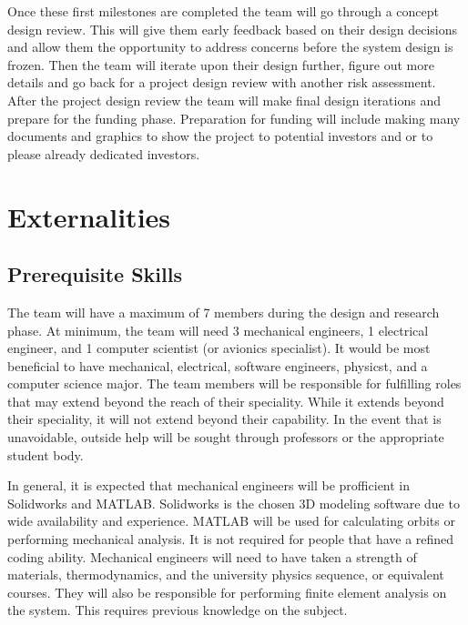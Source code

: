 \documentclass[conference]{IEEEtran} %
\begin{document}
Once these first milestones are completed the team will go through a concept design review. This will give them early feedback based on their design decisions and
allow them the opportunity to address concerns before the system design is frozen. Then the team will iterate upon their design further, figure out more details and
go back for a project design review with another risk assessment. After the project design review the team will make final design iterations and prepare for the funding phase.
Preparation for funding will include making many documents and graphics to show the project to potential investors and or to please already dedicated investors.

\section{Externalities}
\subsection{Prerequisite Skills}
The team will have a maximum of 7 members during the design and research phase. At minimum, the team will need 3 mechanical engineers, 1 electrical engineer, and 1 computer scientist (or avionics specialist).
It would be most beneficial to have mechanical, electrical, software engineers, physicst, and a computer science major. The team members will be responsible for fulfilling roles
that may extend beyond the reach of their speciality. While it extends beyond their speciality, it will not extend beyond their capability. In the event that is unavoidable, outside
help will be sought through professors or the appropriate student body.

In general, it is expected that mechanical engineers will be profficient in Solidworks and MATLAB. Solidworks is the chosen 3D modeling software due to wide availability and experience.
MATLAB will be used for calculating orbits or performing mechanical analysis. It is not required for people that have a refined coding ability. Mechanical engineers will need to
have taken a strength of materials, thermodynamics, and the university physics sequence, or equivalent courses. They will also be responsible for performing finite element analysis
on the system. This requires previous knowledge on the subject.
\end{document}
